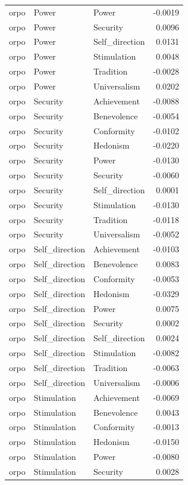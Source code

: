 \begin{tabular}{lllr}
orpo & Power & Power & -0.0019 \\
orpo & Power & Security & 0.0096 \\
orpo & Power & Self\_direction & 0.0131 \\
orpo & Power & Stimulation & 0.0048 \\
orpo & Power & Tradition & -0.0028 \\
orpo & Power & Universalism & 0.0202 \\
orpo & Security & Achievement & -0.0088 \\
orpo & Security & Benevolence & -0.0054 \\
orpo & Security & Conformity & -0.0102 \\
orpo & Security & Hedonism & -0.0220 \\
orpo & Security & Power & -0.0130 \\
orpo & Security & Security & -0.0060 \\
orpo & Security & Self\_direction & 0.0001 \\
orpo & Security & Stimulation & -0.0130 \\
orpo & Security & Tradition & -0.0118 \\
orpo & Security & Universalism & -0.0052 \\
orpo & Self\_direction & Achievement & -0.0103 \\
orpo & Self\_direction & Benevolence & 0.0083 \\
orpo & Self\_direction & Conformity & -0.0053 \\
orpo & Self\_direction & Hedonism & -0.0329 \\
orpo & Self\_direction & Power & 0.0075 \\
orpo & Self\_direction & Security & 0.0002 \\
orpo & Self\_direction & Self\_direction & 0.0024 \\
orpo & Self\_direction & Stimulation & -0.0082 \\
orpo & Self\_direction & Tradition & -0.0063 \\
orpo & Self\_direction & Universalism & -0.0006 \\
orpo & Stimulation & Achievement & -0.0069 \\
orpo & Stimulation & Benevolence & 0.0043 \\
orpo & Stimulation & Conformity & -0.0013 \\
orpo & Stimulation & Hedonism & -0.0150 \\
orpo & Stimulation & Power & -0.0080 \\
orpo & Stimulation & Security & 0.0028 \\

\end{tabular}
